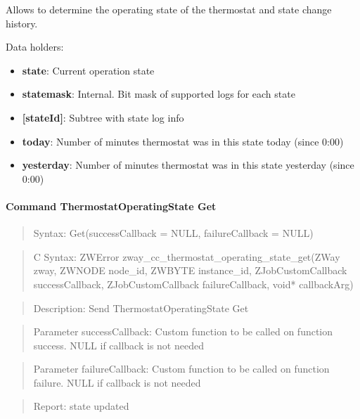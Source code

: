 Allows to determine the operating state of the thermostat and state change history.
\newline

\noindent
Data holders:

\begin{itemize}
\item \textbf{state}: Current operation state
\item \textbf{statemask}: Internal. Bit mask of supported logs for each state
\item \textbf{[stateId]}: Subtree with state log info
\item \qquad\textbf{today}: Number of minutes thermostat was in this state today (since 0:00)
\item \qquad\textbf{yesterday}: Number of minutes thermostat was in this state yesterday (since 0:00)
\end{itemize}

\paragraph{Command ThermostatOperatingState Get}
\begin{quote}Syntax: Get(successCallback = NULL, failureCallback = NULL)\end{quote}
\begin{quote}C Syntax: ZWError zway\_cc\_thermostat\_operating\_state\_get(ZWay zway, ZWNODE node\_id, ZWBYTE instance\_id, ZJobCustomCallback successCallback, ZJobCustomCallback failureCallback, void* callbackArg)\end{quote}
\begin{quote}Description: Send ThermostatOperatingState Get\end{quote}
\begin{quote}Parameter successCallback: Custom function to be called on function success. NULL if callback is not needed\end{quote}
\begin{quote}Parameter failureCallback: Custom function to be called on function failure. NULL if callback is not needed\end{quote}
\begin{quote}Report: state updated\end{quote}

